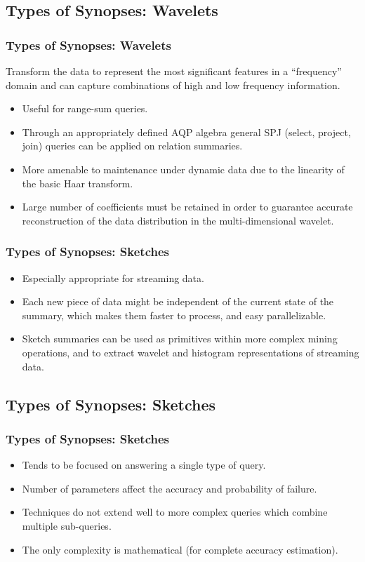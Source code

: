 \documentclass{beamer}
\begin{document}
\subsection{Types of Synopses: Wavelets}
\begin{frame}
\frametitle{Types of Synopses: Wavelets}
Transform the data to represent the most significant features in a “frequency” domain and can capture combinations of high and low frequency information.\pause
\begin{itemize}
\item{Useful for range-sum queries.}
\item{Through an appropriately defined AQP algebra general SPJ (select, project, join) queries can be applied on relation summaries.}
\item{More amenable to maintenance under dynamic data due to the linearity of the basic Haar transform.}
\item{Large number of coefficients must be retained in order to guarantee accurate reconstruction of the data distribution in the multi-dimensional wavelet.}
\end{itemize}
\end{frame}

\begin{frame}
\frametitle{Types of Synopses: Sketches}
\begin{itemize}
\item{Especially appropriate for streaming data.}
\item{Each new piece of data might be independent of the current state of the summary, which  makes them faster to process, and easy parallelizable.}
\item{Sketch summaries can be used as primitives within more complex mining operations, and to extract wavelet and histogram representations of streaming data.}
\end{itemize}
\end{frame}

\subsection{Types of Synopses: Sketches}
\begin{frame}
\frametitle{Types of Synopses: Sketches}
\begin{itemize}
\item{Tends to be focused on answering a single type of query.}
\item{Number of parameters affect the accuracy and probability of failure.}
\item{Techniques do not extend well to more complex queries which combine multiple sub-queries.}
\item{The only complexity is mathematical (for complete accuracy estimation).}
\end{itemize}
\end{frame}
\end{document}
